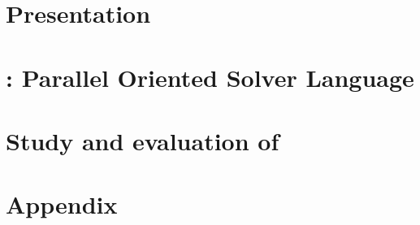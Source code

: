 \documentclass[a4paper,11pt,twoside,parskip=half,numbers=noenddot,bibliography=totocnumbered,listof = totoc]{scrbook}
\begin{document}

\frontmatter
%

\cleardoublepage
%

\cleardoublepage
\dominitoc
\tableofcontents
%
%
%

\mainmatter

\part{Presentation}



\part{\posl{}: Parallel Oriented Solver Language}

\part{Study and evaluation of \posl}

%
%
%

\footnotesize
{} %

\normalsize

\appendix
%

\part{Appendix}





%
\end{document}
